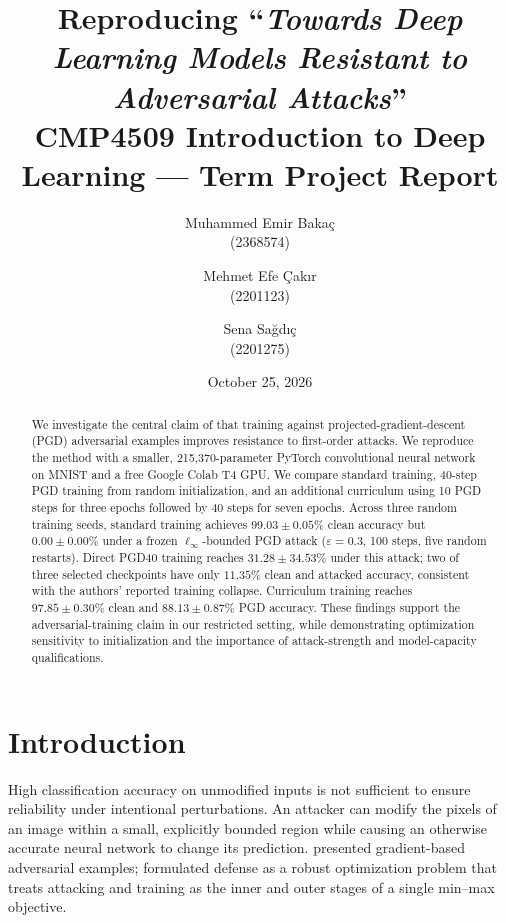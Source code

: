 \documentclass[11pt,a4paper]{article}
\title{Reproducing ``\textit{Towards Deep Learning Models Resistant to Adversarial Attacks}''\\[0.3em]
\large CMP4509 Introduction to Deep Learning --- Term Project Report}
\author{Muhammed Emir Baka\c{c}\\(2368574) \and
Mehmet Efe \c{C}ak\i r\\(2201123) \and
Sena Sa\u{g}d\i\c{c}\\(2201275)}
\date{October 25, 2026}
\newif\ifshowguides
\newcommand{\guide}[1]{%
  \ifshowguides
  \par\medskip\noindent
  \fcolorbox{guideframe}{guidebg}{%
    \begin{minipage}{\dimexpr\linewidth-2\fboxsep-2\fboxrule\relax}
      \small\textbf{Guide.}
      \begin{itemize}[leftmargin=1.2em,itemsep=1pt,topsep=2pt]
        #1
      \end{itemize}
    \end{minipage}}%
  \par\medskip
  \fi}
\newcommand{\linf}{\ell_\infty}
\begin{document}
\maketitle

\begin{abstract}
We investigate the central claim of \citet{madry2018towards} that training against projected-gradient-descent (PGD) adversarial examples improves resistance to first-order attacks. We reproduce the method with a smaller, 215,370-parameter PyTorch convolutional neural network on MNIST and a free Google Colab T4 GPU. We compare standard training, 40-step PGD training from random initialization, and an additional curriculum using 10 PGD steps for three epochs followed by 40 steps for seven epochs. Across three random training seeds, standard training achieves $99.03\pm0.05\%$ clean accuracy but $0.00\pm0.00\%$ under a frozen $\linf$-bounded PGD attack ($\varepsilon=0.3$, 100 steps, five random restarts). Direct PGD40 training reaches $31.28\pm34.53\%$ under this attack; two of three selected checkpoints have only $11.35\%$ clean and attacked accuracy, consistent with the authors' reported training collapse. Curriculum training reaches $97.85\pm0.30\%$ clean and $88.13\pm0.87\%$ PGD accuracy. These findings support the adversarial-training claim in our restricted setting, while demonstrating optimization sensitivity to initialization and the importance of attack-strength and model-capacity qualifications.
\end{abstract}

\guide{
  \item One paragraph, written last.
  \item A reader should learn four things: which paper, which claim, in what setting, and the outcome.
  \item Give your main result as a number (e.g.\ accuracy, mean $\pm$ std), not as ``good'' or ``promising''.
}

\section{Introduction}
\label{sec:intro}
High classification accuracy on unmodified inputs is not sufficient to ensure reliability under intentional perturbations. An attacker can modify the pixels of an image within a small, explicitly bounded region while causing an otherwise accurate neural network to change its prediction. \citet{goodfellow2015explaining} presented gradient-based adversarial examples; \citet{madry2018towards} formulated defense as a robust optimization problem that treats attacking and training as the inner and outer stages of a single min--max objective.
\end{document}

